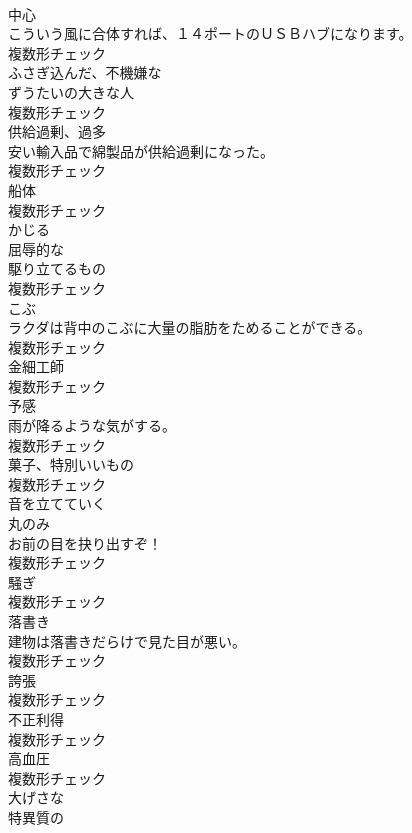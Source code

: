 \documentclass[8pt]{extreport}
\begin{document}
\begin{CJK}{UTF8}{min}
\\	[名詞]	中心	
\\	こういう風に合体すれば、１４ポートのＵＳＢハブになります。	
\\	複数形チェック
\\	[形容詞]	ふさぎ込んだ、不機嫌な	
\\	[名詞]	ずうたいの大きな人	
\\	複数形チェック
\\	[名詞]	供給過剰、過多	
\\	安い輸入品で綿製品が供給過剰になった。	
\\	複数形チェック
\\	[名詞]	船体	
\\	複数形チェック
\\	[動詞]	かじる	
\\	[形容詞]	屈辱的な	
\\	[名詞]	駆り立てるもの	
\\	複数形チェック
\\	[名詞]	こぶ	
\\	ラクダは背中のこぶに大量の脂肪をためることができる。	
\\	複数形チェック
\\	[名詞]	金細工師	
\\	複数形チェック
\\	[名詞]	予感	
\\	雨が降るような気がする。	
\\	複数形チェック
\\	[名詞]	菓子、特別いいもの	
\\	複数形チェック
\\	[動詞]	音を立てていく	
\\	[名詞]	丸のみ	
\\	お前の目を抉り出すぞ！	
\\	複数形チェック
\\	[名詞]	騒ぎ	
\\	複数形チェック
\\	[名詞]	落書き	
\\	建物は落書きだらけで見た目が悪い。	
\\	複数形チェック
\\	[名詞]	誇張	
\\	複数形チェック
\\	[名詞]	不正利得	
\\	複数形チェック
\\	[名詞]	高血圧	
\\	複数形チェック
\\	[形容詞]	大げさな	
\\	[形容詞]	特異質の	

\end{CJK}
\end{document}

